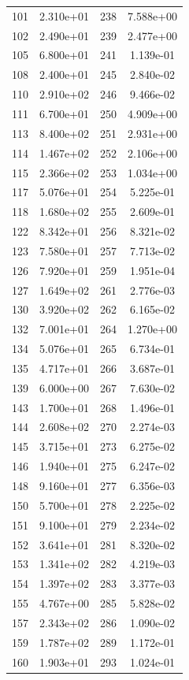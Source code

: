 \documentclass[12pt]{article}
\begin{document}
\begin{longtable}{@{}cccc@{}}
101 & 2.310e+01 & 238 & 7.588e+00 \\
102 & 2.490e+01 & 239 & 2.477e+00 \\
105 & 6.800e+01 & 241 & 1.139e-01 \\
108 & 2.400e+01 & 245 & 2.840e-02 \\
110 & 2.910e+02 & 246 & 9.466e-02 \\
111 & 6.700e+01 & 250 & 4.909e+00 \\
113 & 8.400e+02 & 251 & 2.931e+00 \\
114 & 1.467e+02 & 252 & 2.106e+00 \\
115 & 2.366e+02 & 253 & 1.034e+00 \\
117 & 5.076e+01 & 254 & 5.225e-01 \\
118 & 1.680e+02 & 255 & 2.609e-01 \\
122 & 8.342e+01 & 256 & 8.321e-02 \\
123 & 7.580e+01 & 257 & 7.713e-02 \\
126 & 7.920e+01 & 259 & 1.951e-04 \\
127 & 1.649e+02 & 261 & 2.776e-03 \\
130 & 3.920e+02 & 262 & 6.165e-02 \\
132 & 7.001e+01 & 264 & 1.270e+00 \\
134 & 5.076e+01 & 265 & 6.734e-01 \\
135 & 4.717e+01 & 266 & 3.687e-01 \\
139 & 6.000e+00 & 267 & 7.630e-02 \\
143 & 1.700e+01 & 268 & 1.496e-01 \\
144 & 2.608e+02 & 270 & 2.274e-03 \\
145 & 3.715e+01 & 273 & 6.275e-02 \\
146 & 1.940e+01 & 275 & 6.247e-02 \\
148 & 9.160e+01 & 277 & 6.356e-03 \\
150 & 5.700e+01 & 278 & 2.225e-02 \\
151 & 9.100e+01 & 279 & 2.234e-02 \\
152 & 3.641e+01 & 281 & 8.320e-02 \\
153 & 1.341e+02 & 282 & 4.219e-03 \\
154 & 1.397e+02 & 283 & 3.377e-03 \\
155 & 4.767e+00 & 285 & 5.828e-02 \\
157 & 2.343e+02 & 286 & 1.090e-02 \\
159 & 1.787e+02 & 289 & 1.172e-01 \\
160 & 1.903e+01 & 293 & 1.024e-01 \\

\end{longtable}
\end{document}

